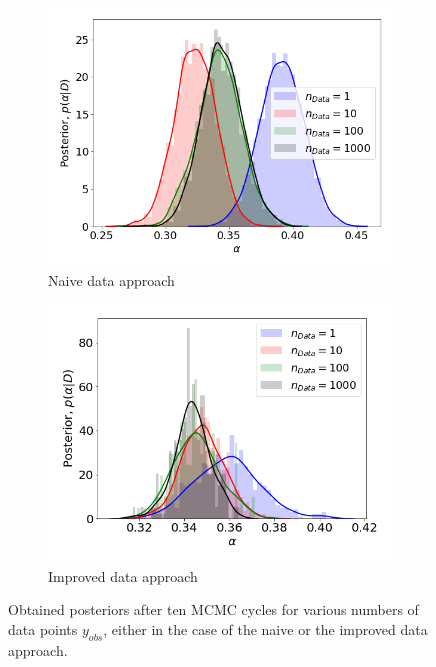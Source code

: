 \documentclass[11pt,a4paper]{article}
\begin{document}
\begin{figure}[ht]
    \centering
    \begin{subfigure}{.46\textwidth}
          \centering
          \includegraphics[width=1\textwidth]{figures/data_naive.png}
          \caption{Naive data approach} 
          \label{fig:data_naive}
    \end{subfigure}%
    \begin{subfigure}{.46\textwidth}
          \centering
          \includegraphics[width=1\textwidth]{figures/data_improved.png}
          \caption{Improved data approach}
    \label{fig:data_improved}
    \end{subfigure}
    \caption{Obtained posteriors after ten MCMC cycles for various numbers of data points $y_{obs}$, either in the case of the naive or the improved data approach.}
    \label{fig:data}
\end{figure}
\end{document}
